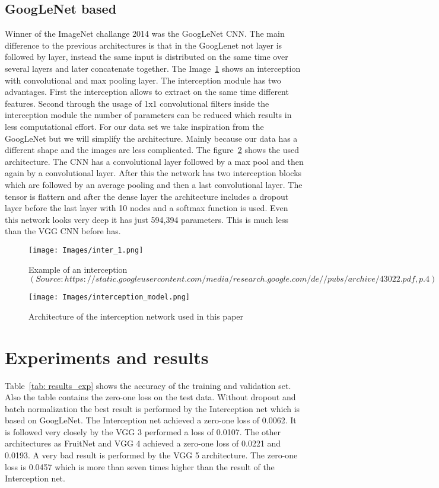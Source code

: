\documentclass[11pt, a4paper]{article}
\begin{document}
\subsection{GoogLeNet based}
Winner of the ImageNet challange 2014 was the GoogLeNet CNN. The main difference to the previous architectures is that in the GoogLenet not layer is followed by layer, instead the same input is distributed on the same time over several layers and later concatenate together. The Image~\ref{fig: intercept} shows an interception with convolutional and max pooling layer. The interception module has two advantages. First the interception allows to extract on the same time different features. Second through the usage of 1x1 convolutional filters inside the interception module the number of parameters can be reduced which results in less computational effort.\cite{goolenet}
For our data set we take inspiration from the GoogLeNet but we will simplify the architecture. Mainly because our data has a different shape and the images are less complicated. The figure~\ref{fig: intercept_keras} shows the used architecture. The CNN has a convolutional layer followed by a max pool and then again by a convolutional layer. After this the network has two interception blocks which are followed by an average pooling and then a last convolutional layer. The tensor is flattern and after the dense layer the architecture includes a dropout layer before the last layer with 10 nodes and a softmax function is used. Even this network looks very deep it has just 594,394 parameters. This is much less than the VGG CNN before has.

\begin{figure}[ht]
\centering
\texttt{[image: Images/inter\_1.png]} 
\caption{Example of an interception $(Source: https://static.googleusercontent.com/media/research.google.com/de//pubs/archive/43022.pdf, p.4)$}
\label{fig: intercept}
\end{figure}

\begin{figure}[ht]
\centering
\texttt{[image: Images/interception\_model.png]} 
\caption{Architecture of the interception network used in this paper}
\label{fig: intercept_keras}
\end{figure}
\clearpage

\section{Experiments and results}
Table~\ref{tab: results_exp} shows the accuracy of the training and validation set. Also the table contains the zero-one loss on the test data. Without dropout and batch normalization the best result is performed by the Interception net which is based on GoogLeNet. The Interception net achieved a zero-one loss of 0.0062. It is followed very closely by the VGG 3 performed a loss of 0.0107. The other architectures as FruitNet and VGG 4 achieved a zero-one loss of 0.0221 and 0.0193. A very bad result is performed by the VGG 5 architecture. The zero-one loss is 0.0457 which is more than seven times higher than the result of the Interception net.
\end{document}
